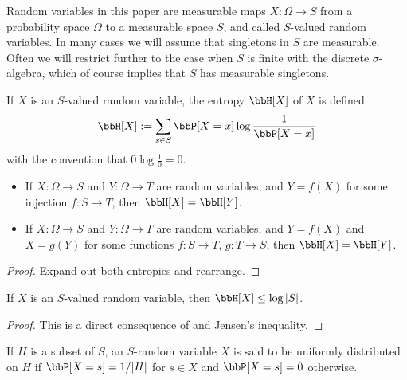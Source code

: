 Random variables in this paper are measurable maps $X : \Omega \to S$ from a probability space $\Omega$ to a measurable space $S$, and called $S$-valued random variables. In many cases we will assume that singletons in $S$ are measurable.  Often we will restrict further to the case when $S$ is finite with the discrete $\sigma$-algebra, which of course implies that $S$ has measurable singletons.

\begin{definition}[Entropy]
  \label{entropy-def}
  \leanok
  If $X$ is an $S$-valued random variable, the entropy $\bbH[X]$ of $X$ is defined
  $$ \bbH[X] := \sum_{s \in S} \bbP[X=x] \log \frac{1}{\bbP[X=x]}$$
  with the convention that $0 \log \frac{1}{0} = 0$.
\end{definition}

\begin{lemma}\label{relabeled-entropy} \leanok
  \begin{itemize}
\item[(i)]   If $X: \Omega \to S$ and $Y: \Omega \to T$ are random variables, and $Y = f(X)$ for some injection $f: S \to T$, then $\bbH[X] = \bbH[Y]$.
\item[(ii)]   If $X: \Omega \to S$ and $Y: \Omega \to T$ are random variables, and $Y = f(X)$ and $X = g(Y)$ for some functions $f: S \to T$, $g: T \to S$, then $\bbH[X] = \bbH[Y]$.
\end{itemize}
\end{lemma}

\begin{proof} \leanok Expand out both entropies and rearrange.
\end{proof}

\begin{lemma}\label{jensen-bound}
  \leanok
  If $X$ is an $S$-valued random variable, then $\bbH[X] \leq \log |S|$.
\end{lemma}

\begin{proof}
  \leanok

  This is a direct consequence of  and Jensen's inequality.
\end{proof}

\begin{definition}\label{uniform-def}\leanok
   If $H$ is a subset of $S$, an $S$-random variable $X$ is said to be uniformly distributed on $H$ if $\bbP[X = s] = 1/|H|$ for $s \in X$ and $\bbP[X=s] = 0$ otherwise.
\end{definition}


